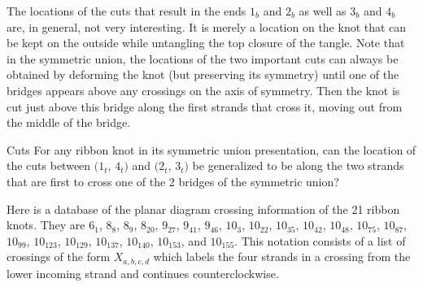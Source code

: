 \begin{paper}
The locations of the cuts that result in the ends $1_b$ and $2_b$ as well as
$3_b$ and $4_b$ are, in general, not very interesting.
It is merely a location on the knot that can be kept on the outside while
untangling the top closure of the tangle.
Note that in the symmetric union, the locations of the two important cuts can
always be obtained by deforming the knot (but preserving its symmetry) until one
of the bridges appears above any crossings on the axis of symmetry.
Then the knot is cut just above this bridge along the first strands that cross
it, moving out from the middle of the bridge.

\newsavebox{\mirrorR}


\begin{paperquestion}{Cuts}
For any ribbon knot in its symmetric union presentation, can the location of the
cuts between $(1_t$, $4_t)$ and $(2_t$, $3_t)$ be generalized to be along the
two strands that are first to cross one of the 2 bridges of the symmetric union?
\end{paperquestion}

Here is a database of the planar diagram crossing information of the 21 ribbon
knots.
They are $6_1$, $8_8$, $8_9$, $8_{20}$, $9_{27}$, $9_{41}$, $9_{46}$, $10_3$,
$10_{22}$, $10_{35}$, $10_{42}$, $10_{48}$, $10_{75}$, $10_{87}$, $10_{99}$,
$10_{123}$, $10_{129}$, $10_{137}$, $10_{140}$, $10_{153}$, and $10_{155}$.
This notation consists of a list of crossings of the form $X_{a,b,c,d}$ which
labels the four strands in a crossing from the lower incoming strand and
continues counterclockwise.

~~~~~~~~~~~
\vspace{12pt}


\end{paper}
